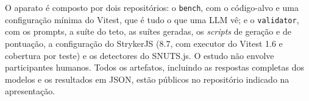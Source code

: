 O aparato é composto por dois repositórios: o \texttt{bench}, com o código-alvo e uma configuração mínima do Vitest, que é tudo o que uma LLM vê; e o \texttt{validator}, com os prompts, a suíte do teto, as suítes geradas, os \textit{scripts} de geração e de pontuação, a configuração do StrykerJS (8.7, com executor do Vitest 1.6 e cobertura por teste) e os detectores do SNUTS.js. O estudo não envolve participantes humanos. Todos os artefatos, incluindo as respostas completas dos modelos e os resultados em JSON, estão públicos no repositório indicado na apresentação.
